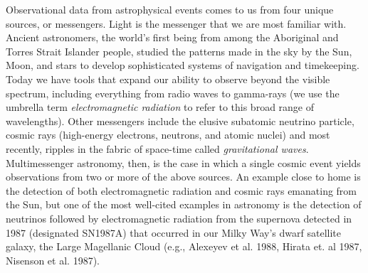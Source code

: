 \documentclass[1.5,11pt]{beavtex}
\begin{document}
Observational data from astrophysical events comes to us from four unique sources, or messengers. Light is the messenger that we are most familiar with. Ancient astronomers, the world's first being from among the Aboriginal and Torres Strait Islander people, studied the patterns made in the sky by the Sun, Moon, and stars to develop sophisticated systems of navigation and timekeeping. Today we have tools that expand our ability to observe beyond the visible spectrum, including everything from radio waves to gamma-rays (we use the umbrella term \textit{electromagnetic radiation} to refer to this broad range of wavelengths). Other messengers include the elusive subatomic neutrino particle, cosmic rays (high-energy electrons, neutrons, and atomic nuclei) and most recently, ripples in the fabric of space-time called \textit{gravitational waves}. Multimessenger astronomy, then, is the case in which a single cosmic event yields observations from two or more of the above sources. An example close to home is the detection of both electromagnetic radiation and cosmic rays emanating from the Sun, but one of the most well-cited examples in astronomy is the detection of neutrinos followed by electromagnetic radiation from the supernova detected in 1987 (designated SN1987A) that occurred in our Milky Way's dwarf satellite galaxy, the Large Magellanic Cloud (e.g., Alexeyev et al. 1988, Hirata et. al 1987, Nisenson et al. 1987).
\end{document}
